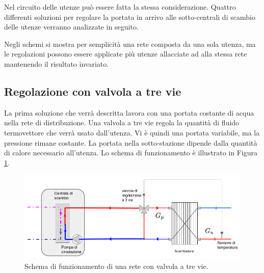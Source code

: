\documentclass[laurea,oneside,11pt]{USiena_tesiLM3}
\begin{document}
Nel circuito delle utenze può essere fatta la stessa considerazione. Quattro differenti soluzioni per regolare la portata in arrivo alle sotto-centrali di scambio delle utenze verranno analizzate in seguito.

Negli schemi si mostra per semplicità una rete composta da una sola utenza, ma le regolazioni possono essere applicate più utenze allacciate ad alla stessa rete mantenendo il risultato invariato.

\subsection{Regolazione con valvola a tre vie}
\label{subsec:3vie}
La prima soluzione che verrà descritta lavora con una portata costante di acqua nella rete di distribuzione. Una valvola a tre vie regola la quantità di fluido termovettore che verrà usato dall'utenza. Vi è quindi una portata variabile, ma la pressione rimane costante. La portata nella sotto-stazione dipende dalla quantità di calore necessario all'utenza.  Lo schema di funzionamento è illustrato in Figura \ref{fig:3vie}.

\begin{figure}[!ht]
\centering
\includegraphics[width=\textwidth]{figure/3vie}
\caption{Schema di funzionamento di una rete con valvola a tre vie.}
\label{fig:3vie}

\end{figure}
\end{document}

